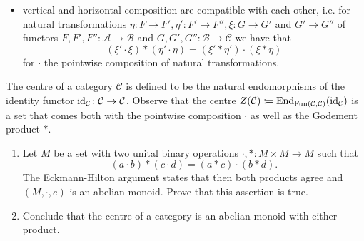 \begin{Exercise}
\begin{enumerate}[label=(\alph*)]
\begin{itemize}
			\item 
			vertical and horizontal composition are compatible with each other, i.e. for natural transformations $ \eta \colon F \to F', \eta' \colon F' \to F'', \xi \colon G \to G'$ and $G' \to G''$ of functors $ F , F' , F'' \colon \mathcal{ A } \to \mathcal{ B } $ and $ G , G', G'' \colon \mathcal{ B } \to \mathcal{ C } $ we have that 
			\[
			( \xi' \cdot \xi ) * ( \eta' \cdot \eta ) = ( \xi' * \eta' ) \cdot ( \xi * \eta ) 
			\]
			for $ \cdot $ the pointwise composition of natural transformations.
		\end{itemize}
	\end{enumerate}
	The centre of a category $ \mathcal{ C } $ is defined to be the natural endomorphisms of the identity functor $ \operatorname{id}_{ \mathcal{ C } } \colon \mathcal{ C } \to \mathcal{ C } $. 
	Observe that the centre $ Z ( \mathcal{ C } ) \coloneqq \operatorname{End}_{ \operatorname{Fun} ( \mathcal{ C } , \mathcal{ C } )} ( \operatorname{id}_{ \mathcal{ C } } ) $ is a set that comes both with the pointwise composition $ \cdot $ as well as the Godement product $ * $.
	\begin{enumerate}[resume]
		\item 
		Let $ M $ be a set with two unital binary operations $ \cdot , * \colon M \times M \to M $ such that
		\[
		( a \cdot b ) * ( c \cdot d ) = ( a * c ) \cdot ( b * d ). 
		\]
		The Eckmann-Hilton argument states that then both products agree and $ ( M , \cdot , e ) $ is an abelian monoid. Prove that this assertion is true.
		
		\item 
		Conclude that the centre of a category is an abelian monoid with either product. 
		
	\end{enumerate}
\end{Exercise} 

